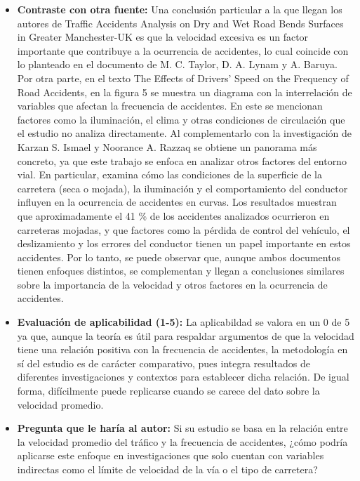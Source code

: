 \documentclass[12pt]{article}
\begin{document}
\begin{itemize}
	\item \textbf{Contraste con otra fuente:} Una conclusión particular a la que 
	llegan los autores de Traffic Accidents Analysis on Dry and Wet Road Bends Surfaces 
	in Greater Manchester-UK es que la velocidad excesiva es un factor importante que 
	contribuye a la ocurrencia de accidentes, lo cual coincide con lo planteado en el 
	documento de M. C. Taylor, D. A. Lynam y A. Baruya. Por otra parte, en el texto The 
	Effects of Drivers' Speed on the Frequency of Road Accidents, en la figura 5 se 
	muestra un diagrama con la interrelación de variables que afectan la frecuencia 
	de accidentes. En este se mencionan factores como la iluminación, el clima y otras
	condiciones de circulación que el estudio no analiza directamente. Al complementarlo 
	con la investigación de Karzan S. Ismael y Noorance A. Razzaq se obtiene un panorama 
	más concreto, ya que este trabajo se enfoca en analizar otros factores del entorno vial. 
	En particular, examina cómo las condiciones de la superficie de la carretera (seca o mojada), 
	la iluminación y el comportamiento del conductor influyen en la ocurrencia de accidentes en 
	curvas. Los resultados muestran que aproximadamente el 41 \% de los accidentes analizados 
	ocurrieron en carreteras mojadas, y que factores como la pérdida de control del vehículo,
	el deslizamiento y los errores del conductor tienen un papel importante en estos accidentes. 
	Por lo tanto, se puede observar que, aunque ambos documentos tienen enfoques distintos, 
	se complementan y llegan a conclusiones similares sobre la importancia de la velocidad y
	otros factores en la ocurrencia de accidentes.   
	
	\item \textbf{Evaluación de aplicabilidad (1-5):} La aplicabildad se valora en
	un 0 de 5 ya que, aunque la teoría es útil para respaldar argumentos de que la 
	velocidad tiene una relación positiva con la frecuencia de accidentes, la metodología 
	en sí del estudio es de carácter comparativo, pues integra resultados de diferentes 
	investigaciones y contextos para establecer dicha relación. De igual forma, difícilmente 
	puede replicarse cuando se carece del dato sobre la velocidad promedio.   
	
	\item \textbf{Pregunta que le haría al autor:} Si su estudio se basa en la 
	relación entre la velocidad promedio del tráfico y la frecuencia de accidentes, 
	¿cómo podría aplicarse este enfoque en investigaciones que solo cuentan con variables 
	indirectas como el límite de velocidad de la vía o el tipo de carretera? 
	

\end{itemize}
\end{document}
